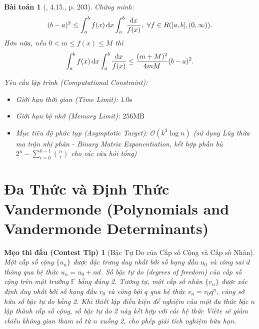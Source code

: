 \documentclass{article}
\newtheorem{baitoan}{Bài toán}
\newtheorem{tip}{Mẹo thi đấu (Contest Tip)}
\begin{document}
\begin{baitoan}[\cite{Quoc_Long_Dat_Nam_VMC}, 4.15., p. 203]
	Chứng minh:
	\begin{equation*}
		(b - a)^2\le\int_a^b f(x)\,{\rm d}x\int_a^b \frac{{\rm d}x}{f(x)},\ \forall f\in R([a,b],(0,\infty)).
	\end{equation*}
	Hơn nữa, nếu $0 < m\le f(x)\le M$ thì
	\begin{equation*}
		\int_a^b f(x)\,{\rm d}x\int_a^b \frac{{\rm d}x}{f(x)}\le\frac{(m + M)^2}{4mM}(b - a)^2.
	\end{equation*}

    \vspace{0.5em}
    \emph{Yêu cầu lập trình (Computational Constraint):}
    \begin{itemize}
        \item Giới hạn thời gian (Time Limit): $1.0\mathrm{s}$
        \item Giới hạn bộ nhớ (Memory Limit): $256\mathrm{MB}$
        \item Mục tiêu độ phức tạp (Asymptotic Target): $\mathcal{O}(k^3 \log n)$ (sử dụng Lũy thừa ma trận nhị phân - Binary Matrix Exponentiation, kết hợp phần bù $2^n - \sum_{i=0}^{k-1} \binom{n}{i}$ cho các câu hỏi tổng)
    \end{itemize}
\end{baitoan}


\section{Đa Thức và Định Thức Vandermonde (Polynomials and Vandermonde Determinants)}

\begin{tip}[Bậc Tự Do của Cấp số Cộng và Cấp số Nhân]
Một cấp số cộng $\{u_n\}$ được đặc trưng duy nhất bởi số hạng đầu $u_0$ và công sai $d$ thông qua hệ thức $u_n = u_0 + nd$. Số bậc tự do (degrees of freedom) của cấp số cộng trên một trường $\mathbb{F}$ bằng đúng 2. Tương tự, một cấp số nhân $\{v_n\}$ được xác định duy nhất bởi số hạng đầu $v_0$ và công bội $q$ qua hệ thức $v_n = v_0 q^n$, cũng sở hữu số bậc tự do bằng 2. Khi thiết lập điều kiện để nghiệm của một đa thức bậc $n$ lập thành cấp số cộng, số bậc tự do 2 này kết hợp với các hệ thức Viète sẽ giảm chiều không gian tham số từ $n$ xuống 2, cho phép giải tích nghiệm hữu hạn.
\end{tip}
\end{document}
